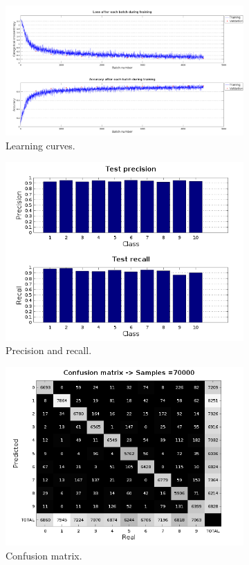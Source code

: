 \begin{figure}
	\centering
	\begin{subfigure}{1\textwidth}
		\centering
		\includegraphics[width=1\linewidth]{figures/learning_curves.png}
		\caption{Learning curves.}
	\end{subfigure}
	\begin{subfigure}{0.5\textwidth}
		\centering
		\includegraphics[width=0.9\linewidth]{figures/prec_rec.png}
		\caption{Precision and recall.}
	\end{subfigure}%
	\begin{subfigure}{0.5\textwidth}
		\centering
		\includegraphics[width=0.9\linewidth]{figures/conf_mat.png}
		\caption{Confusion matrix.}
	\end{subfigure}
	\caption[Example of usage of \textit{benchmark.m}.]{}
	\label{fig:benchmark}
\end{figure}

